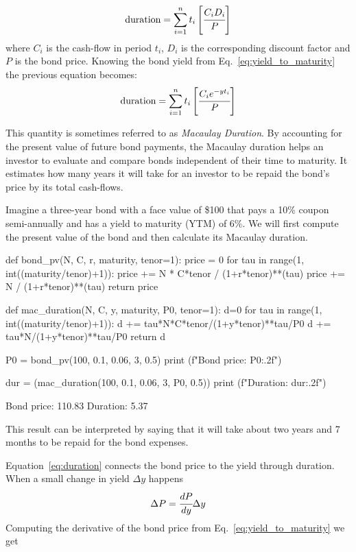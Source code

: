 \begin{equation}
\textrm{duration} = \sum_{i=1}^{n} t_i \left[\cfrac{C_i D_i}{P}\right] 
\end{equation}
where $C_i$ is the cash-flow in period $t_i$, $D_i$ is the corresponding discount factor and $P$ is the bond price.
Knowing the bond yield from Eq.~\ref{eq:yield_to_maturity} the previous equation becomes:
\begin{equation}
\textrm{duration} = \sum_{i=1}^{n} t_i \left[\cfrac{C_i e^{-yt_i}}{P}\right] 
\label{eq:duration}
\end{equation}

This quantity is sometimes referred to as \emph{Macaulay Duration}. By accounting for the present value of future bond payments, the Macaulay duration helps an investor to evaluate and compare bonds independent of their time to maturity.
It estimates how many years it will take for an investor to be repaid the bond’s price by its total cash-flows.

Imagine a three-year bond with a face value of \$100 that pays a 10\% coupon semi-annually and has a yield to maturity (YTM) of 6\%. We will first compute the present value of the bond and then calculate its Macaulay duration.

\begin{ipython}
def bond_pv(N, C, r, maturity, tenor=1):
	price = 0
	for tau in range(1, int((maturity/tenor)+1)):
		price += N * C*tenor / (1+r*tenor)**(tau)
	price += N / (1+r*tenor)**(tau)
	return price

def mac_duration(N, C, y, maturity, P0, tenor=1): 
	d=0
	for tau in range(1, int((maturity/tenor)+1)):
		d += tau*N*C*tenor/(1+y*tenor)**tau/P0
	d += tau*N/(1+y*tenor)**tau/P0 
	return d

P0 = bond_pv(100, 0.1, 0.06, 3, 0.5)
print (f"Bond price: {P0:.2f}")

dur = (mac_duration(100, 0.1, 0.06, 3, P0, 0.5))
print (f"Duration: {dur:.2f}")
\end{ipython}
\begin{ioutput}
Bond price: 110.83
Duration: 5.37
\end{ioutput}

This result can be interpreted by saying that it will take about two years and 7 months to be repaid for the bond expenses.

Equation~\ref{eq:duration} connects the bond price to the yield through duration. When a small change in yield $\Delta y$ happens
\begin{equation}
\Delta P = \cfrac{dP}{dy}\Delta y
\label{eq:price_1st_order}
\end{equation}
\noindent
Computing the derivative of the bond price from Eq.~\ref{eq:yield_to_maturity} we get

